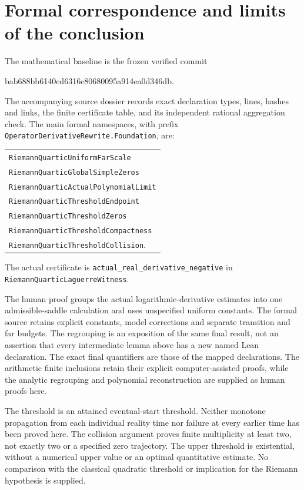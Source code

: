 \documentclass[11pt]{article}
\theoremstyle{remark}\newtheorem{remark}[theorem]{Remark}
\newcommand{\code}[1]{{\small\nolinkurl{#1}}}
\begin{document}
\section{Formal correspondence and limits of the conclusion}
The mathematical baseline is the frozen verified commit
\begin{center}\small\ttfamily
bab688bb6140cd6316c80680095a914ea0d346db.
\end{center}
The accompanying source dossier records exact declaration
types, lines, hashes and links, the finite certificate table,
and its independent rational aggregation check. The main
formal namespaces, with prefix
\code{OperatorDerivativeRewrite.Foundation}, are:
\begin{center}
\begin{tabular}{@{}l@{}}
\code{RiemannQuarticUniformFarScale}\\
\code{RiemannQuarticGlobalSimpleZeros}\\
\code{RiemannQuarticActualPolynomialLimit}\\
\code{RiemannQuarticThresholdEndpoint}\\
\code{RiemannQuarticThresholdZeros}\\
\code{RiemannQuarticThresholdCompactness}\\
\code{RiemannQuarticThresholdCollision}.
\end{tabular}
\end{center}
The actual certificate is \code{actual_real_derivative_negative}
in \code{RiemannQuarticLaguerreWitness}.

The human proof groups the actual logarithmic-derivative
estimates into one admissible-saddle calculation and uses
unspecified uniform constants. The formal source retains
explicit constants, model corrections and separate transition
and far budgets. The regrouping is an exposition of the same
final result, not an assertion that every intermediate lemma
above has a new named Lean declaration. The exact final
quantifiers are those of the mapped declarations. The
arithmetic finite inclusions retain their explicit
computer-assisted proofs, while the analytic regrouping and
polynomial reconstruction are supplied as human proofs here.

The threshold is an attained eventual-start threshold.
Neither monotone propagation from each individual reality
time nor failure at every earlier time has been proved here.
The collision argument proves finite multiplicity at least
two, not exactly two or a specified zero trajectory.
The upper threshold is existential, without a numerical
upper value or an optimal quantitative estimate.
No comparison with the classical quadratic threshold or
implication for the Riemann hypothesis is supplied.
\end{document}
